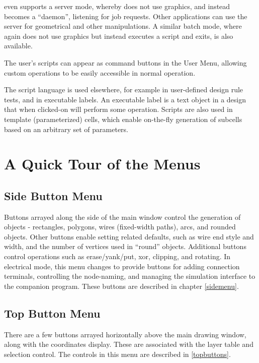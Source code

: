 {\Xic} even supports a server mode, whereby {\Xic} does not use
graphics, and instead becomes a ``daemon'', listening for job
requests.  Other applications can use the server for geometrical and
other manipulations.  A similar batch mode, where {\Xic} again does
not use graphics but instead executes a script and exits, is also
available.

The user's scripts can appear as command buttons in the {\cb User
Menu}, allowing custom operations to be easily accessible in normal
operation.

The script language is used elsewhere, for example in user-defined
design rule tests, and in executable labels.  An executable label is a
text object in a design that when clicked-on will perform some
operation.  Scripts are also used in template (parameterized) cells,
which enable on-the-fly generation of subcells based on an arbitrary
set of parameters.


\section{A Quick Tour of the {\Xic} Menus}

\subsection{Side Button Menu}

Buttons arrayed along the side of the main window control the
generation of objects - rectangles, polygons, wires (fixed-width
paths), arcs, and rounded objects.  Other buttons enable setting
related defaults, such as wire end style and width, and the number of
vertices used in ``round'' objects.  Additional buttons control
operations such as erase/yank/put, xor, clipping, and rotating.  In
electrical mode, this menu changes to provide buttons for adding
connection terminals, controlling the node-naming, and managing the
simulation interface to the companion {\WRspice} program.  These
buttons are described in chapter \ref{sidemenu}.

\subsection{Top Button Menu}

There are a few buttons arrayed horizontally above the main drawing
window, along with the coordinates display.  These are associated with
the layer table and selection control.  The controls in this menu are
described in \ref{topbuttons}.

